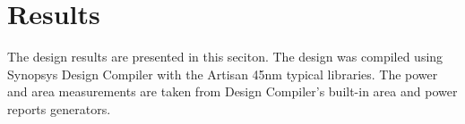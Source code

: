 \chapter{Results}
\label{chap:results}
The design results are presented in this seciton.  The design was compiled using Synopsys Design Compiler with the Artisan 45nm typical libraries.  The power and area measurements are taken from Design Compiler's built-in area and power reports generators.   






